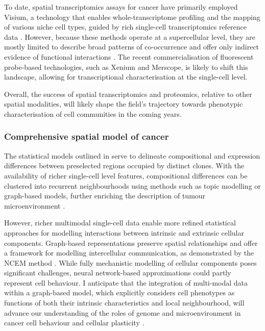 To date, spatial transcriptomics assays for cancer have primarily employed \ac{Visium}, a technology that enables whole-transcriptome profiling and the mapping of various niche cell types, guided by rich single-cell transcriptomics reference data \parencite{Andersson2021-pu, Stahl2016-nq, Wu2021-uq, Berglund2018-gh, Moncada2020-ck, Qi2022-by, Ji2020-gn, Ravi2022-ut, Wu2021-wb, Gouin2021-zx, Barkley2022-gx, Erickson2022-zh}. However, because these methods operate at a supercellular level, they are mostly limited to describe broad patterns of co-occurrence and offer only indirect evidence of functional interactions . The recent commercialisation of fluorescent probe-based technologies, such as \ac{Xenium} and \ac{Merscope}, is likely to shift this landscape, allowing for transcriptional characterisation at the single-cell level.

Overall, the success of spatial transcriptomics and proteomics, relative to other spatial modalities, will likely shape the field's trajectory towards phenotypic characterisation of cell communities in the coming years.

\subsubsection*{Comprehensive spatial model of cancer}

The statistical models outlined in  serve to delineate compositional and expression differences between preselected regions occupied by distinct clones. With the availability of richer single-cell level features, compositional differences can be clustered into recurrent neighbourhoods using methods such as topic modelling or graph-based models, further enriching the description of tumour microenvironment \parencite{Danenberg2022-zb, Jackson2020-em, Nirmal2022-sq, Schurch2020-lp, Wang2023-bo}.


However, richer multimodal single-cell data enable more refined statistical approaches for modelling interactions between intrinsic and extrinsic cellular components. Graph-based representations preserve spatial relationships and offer a framework for modelling intercellular communication, as demonstrated by the NCEM method \parencite{Fischer2023-go}. While fully mechanistic modelling of cellular components poses significant challenges, neural network-based approximations could partly represent cell behaviour. I anticipate that the integration of multi-modal data within a graph-based model, which explicitly considers cell phenotypes as functions of both their intrinsic characteristics and local neighbourhood, will advance our understanding of the roles of genome and microenvironment in cancer cell behaviour and cellular plasticity .

